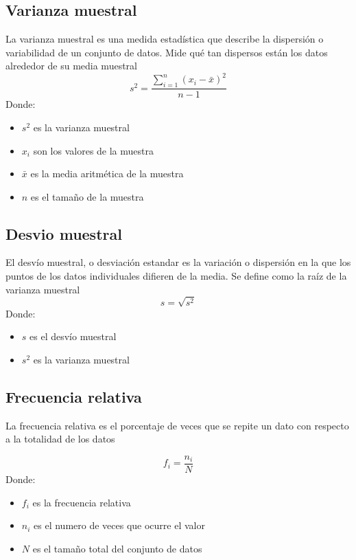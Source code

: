 \documentclass{article}
\begin{document}
\subsection{Varianza muestral}
La varianza muestral es una medida estadística que describe la dispersión o variabilidad de un conjunto de datos. Mide qué tan dispersos están los datos alrededor de su media muestral \cite{Estadisticas}
\begin{equation}
s^2 = \frac{\sum_{i=1}^{n}(x_i - \bar{x})^2}{n-1}
\end{equation}
Donde:
\begin{itemize}
    \item \(s^2\) es la varianza muestral
    \item \(x_i\) son los valores de la muestra
    \item \(\bar{x}\) es la media aritmética de la muestra
    \item \(n\) es el tamaño de la muestra
\end{itemize}

\subsection{Desvio muestral}
El desvío muestral, o desviación estandar es la variación o dispersión en la que los puntos de los datos individuales difieren de la media. Se define como la raíz de la varianza muestral \cite{Estadisticas}
\begin{equation}
s = \sqrt{s^2}
\end{equation}
Donde:
\begin{itemize}
    \item \(s\) es el desvío muestral
    \item \(s^2\) es la varianza muestral 
\end{itemize}

\subsection{Frecuencia relativa}
La frecuencia relativa es el porcentaje de veces que se repite un dato con respecto a la totalidad de los datos

\begin{equation}
f_i = \frac{n_i}{N}
\end{equation}
Donde:
\begin{itemize}
    \item \(f_i\) es la frecuencia relativa
    \item \(n_i\) es el numero de veces que ocurre el valor
    \item \(N\) es el tamaño total del conjunto de datos
\end{itemize}
\end{document}
